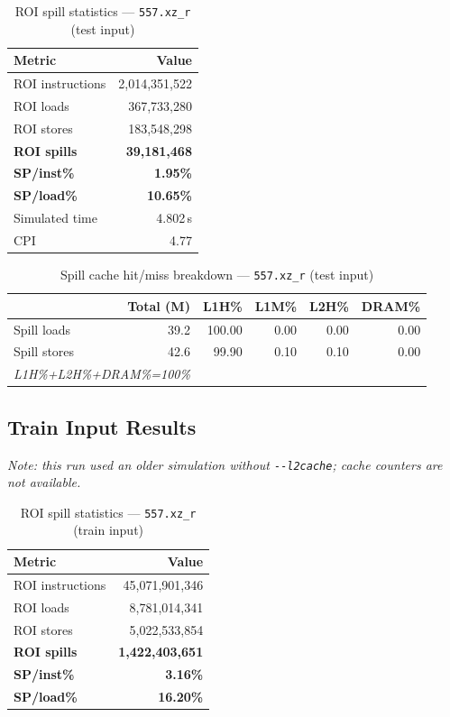 \documentclass[11pt,a4paper]{article}
\begin{document}
\begin{table}[H]
\centering
\caption{ROI spill statistics --- \texttt{557.xz\_r} (test input)}
\label{tab:xz_test_roi}
\begin{tabular}{lr}
\toprule
\textbf{Metric} & \textbf{Value} \\
\midrule
ROI instructions & 2,014,351,522 \\
ROI loads        & 367,733,280 \\
ROI stores       & 183,548,298 \\
\textbf{ROI spills}   & \textbf{39,181,468} \\
\textbf{SP/inst\%}   & \textbf{1.95\%} \\
\textbf{SP/load\%}   & \textbf{10.65\%} \\
Simulated time   & 4.802\,s \\
CPI              & 4.77 \\
\bottomrule
\end{tabular}
\end{table}

\begin{table}[H]
\centering
\caption{Spill cache hit/miss breakdown --- \texttt{557.xz\_r} (test input)}
\label{tab:xz_test_cache}
\begin{tabular}{lrrrrr}
\toprule
\textbf{} & \textbf{Total (M)} & \textbf{L1H\%} & \textbf{L1M\%} & \textbf{L2H\%} & \textbf{DRAM\%} \\
\midrule
Spill loads  & 39.2 & 100.00 & 0.00 & 0.00 & 0.00 \\
Spill stores & 42.6 & 99.90 & 0.10 & 0.10 & 0.00 \\
\multicolumn{2}{l}{\small\textit{L1H\%+L2H\%+DRAM\%=100\%}} \\
\bottomrule
\end{tabular}
\end{table}

\subsection{Train Input Results}

\textit{Note: this run used an older simulation without \texttt{-{}-l2cache}; cache counters are not available.}


\begin{table}[H]
\centering
\caption{ROI spill statistics --- \texttt{557.xz\_r} (train input)}
\label{tab:xz_train_roi}
\begin{tabular}{lr}
\toprule
\textbf{Metric} & \textbf{Value} \\
\midrule
ROI instructions & 45,071,901,346 \\
ROI loads        & 8,781,014,341 \\
ROI stores       & 5,022,533,854 \\
\textbf{ROI spills}   & \textbf{1,422,403,651} \\
\textbf{SP/inst\%}   & \textbf{3.16\%} \\
\textbf{SP/load\%}   & \textbf{16.20\%} \\
\bottomrule
\end{tabular}
\end{table}
\end{document}
